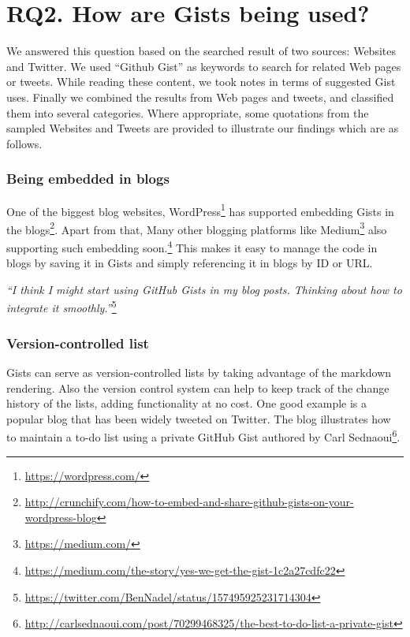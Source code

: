\section{RQ2. How are Gists being used?}

We answered this question based on the searched result of two sources: Websites and Twitter. We used ``Github Gist'' as keywords to search for related Web pages or tweets. While reading these content, we took notes in terms of suggested Gist uses. Finally we combined the results from Web pages and tweets, and classified them into several categories. Where appropriate, some quotations from the sampled Websites and Tweets are provided to illustrate our findings which are as follows. 

\subsubsection{Being embedded in blogs}

One of the biggest blog websites, WordPress\footnote{\url{https://wordpress.com/}} has supported embedding Gists in the blogs\footnote{\url{http://crunchify.com/how-to-embed-and-share-github-gists-on-your-wordpress-blog}}. Apart from that, Many other blogging platforms like Medium\footnote{\url{https://medium.com/}} also supporting such embedding soon.\footnote{\url{https://medium.com/the-story/yes-we-get-the-gist-1c2a27cdfc22}} This makes it easy to manage the code in blogs by saving it in Gists and simply referencing it in blogs by ID or URL.

\textsl{``I think I might start using GitHub Gists in my blog posts. Thinking about how to integrate it smoothly.''}\footnote{\url{https://twitter.com/BenNadel/status/157495925231714304}}

\subsubsection{Version-controlled list}

Gists can serve as version-controlled lists by taking advantage of the markdown rendering. Also the version control system can help to keep track of the change history of the lists, adding functionality at no cost. One good example is a popular blog that has been widely tweeted on Twitter. The blog illustrates how to maintain a to-do list using a private GitHub Gist authored by Carl Sednaoui\footnote{\url{http://carlsednaoui.com/post/70299468325/the-best-to-do-list-a-private-gist}}.

